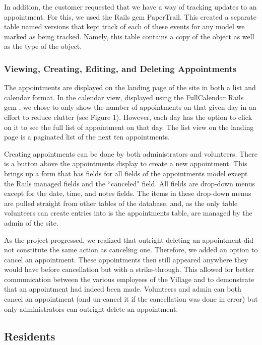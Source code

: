 \documentclass{sig-alternate}
\begin{document}
In addition, the customer requested that we have a way of tracking updates to an appointment. For this, we used the Rails gem PaperTrail. \cite{papertrail} This created a separate table named versions that kept track of each of these events for any model we marked as being tracked. Namely, this table contains a copy of the object as well as the type of the object.

\subsubsection{Viewing, Creating, Editing, and Deleting Appointments}
The appointments are displayed on the landing page of the site in both a list and calendar format. In the calendar view, displayed using the FullCalendar Rails gem \cite{fullcalendar}, we chose to only show the number of appointments on that given day in an effort to reduce clutter (see Figure 1). However, each day has the option to click on it to see the full list of appointment on that day. The list view on the landing page is a paginated list of the next ten appointments.

Creating appointments can be done by both administrators and volunteers. There is a button above the appointments display to create a new appointment. This brings up a form that has fields for all fields of the appointments model except the Rails managed fields and the ``canceled" field. All fields are drop-down menus except for the date, time, and notes fields. The items in these drop-down menus are pulled straight from other tables of the database, and, as the only table volunteers can create entries into is the appointments table, are managed by the admin of the site.

As the project progressed, we realized that outright deleting an appointment did not constitute the same action as canceling one. Therefore, we added an option to cancel an appointment. These appointments then still appeared anywhere they would have before cancellation but with a strike-through. This allowed for better communication between the various employees of the Village and to demonstrate that an appointment had indeed been made. Volunteers and admin can both cancel an appointment (and un-cancel it if the cancellation was done in error) but only administrators can outright delete an appointment.   

\subsection{Residents}
\end{document}

